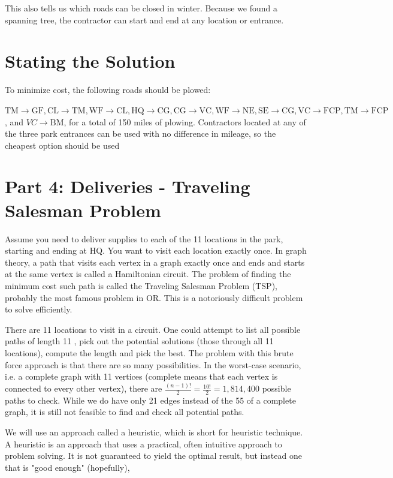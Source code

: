 \documentclass[10pt]{article}
\begin{document}
This also tells us which roads can be closed in winter. Because we found a spanning tree, the contractor can start and end at any location or entrance.

\section{Stating the Solution}
To minimize cost, the following roads should be plowed:

$\mathrm{TM} \rightarrow \mathrm{GF}, \mathrm{CL} \rightarrow \mathrm{TM}, \mathrm{WF} \rightarrow \mathrm{CL}, \mathrm{HQ} \rightarrow \mathrm{CG}, \mathrm{CG} \rightarrow \mathrm{VC}, \mathrm{WF} \rightarrow \mathrm{NE}, \mathrm{SE} \rightarrow \mathrm{CG}, \mathrm{VC} \rightarrow \mathrm{FCP}, \mathrm{TM} \rightarrow \mathrm{FCP}$, and $V C \rightarrow \mathrm{BM}$, for a total of 150 miles of plowing. Contractors located at any of the three park entrances can be used with no difference in mileage, so the cheapest option should be used

\section{Part 4: Deliveries - Traveling Salesman Problem}
Assume you need to deliver supplies to each of the 11 locations in the park, starting and ending at HQ. You want to visit each location exactly once. In graph theory, a path that visits each vertex in a graph exactly once and ends and starts at the same vertex is called a Hamiltonian circuit. The problem of finding the minimum cost such path is called the Traveling Salesman Problem (TSP), probably the most famous problem in OR. This is a notoriously difficult problem to solve efficiently.

There are 11 locations to visit in a circuit. One could attempt to list all possible paths of length 11 , pick out the potential solutions (those through all 11 locations), compute the length and pick the best. The problem with this brute force approach is that there are so many possibilities. In the worst-case scenario, i.e. a complete graph with 11 vertices (complete means that each vertex is connected to every other vertex), there are $\frac{(n-1) !}{2}=\frac{10 !}{2}=1,814,400$ possible paths to check. While we do have only 21 edges instead of the 55 of a complete graph, it is still not feasible to find and check all potential paths.

We will use an approach called a heuristic, which is short for heuristic technique. A heuristic is an approach that uses a practical, often intuitive approach to problem solving. It is not guaranteed to yield the optimal result, but instead one that is "good enough" (hopefully),
\end{document}
